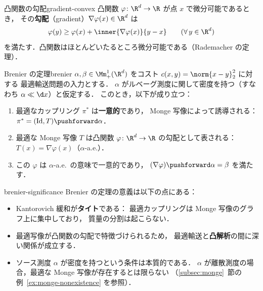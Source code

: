 \begin{definition}{凸関数の勾配}{gradient-convex}
  凸関数 $\varphi \colon \R^d \to \R$ が点 $x$ で微分可能であるとき，
  その\textbf{勾配}（gradient）$\nabla\varphi(x) \in \R^d$ は
  \[
    \varphi(y) \geq \varphi(x) + \inner{\nabla\varphi(x)}{y - x}
    \qquad (\forall\, y \in \R^d)
  \]
  を満たす．凸関数はほとんどいたるところ微分可能である（Rademacher の定理）．
\end{definition}

\begin{theorem}{Brenier の定理}{brenier}
  $\alpha, \beta \in \Mm_+^1(\R^d)$ をコスト $c(x, y) = \norm{x - y}_2^2$ に対する
  最適輸送問題の入力とする．
  $\alpha$ がルベーグ測度に関して密度を持つ（すなわち $\alpha \ll \d x$）と仮定する．
  このとき，以下が成り立つ：
  \begin{enumerate}
    \item 最適なカップリング $\pi^*$ は\textbf{一意的}であり，
      Monge 写像によって誘導される：$\pi^* = (\operatorname{Id}, T)\pushforward \alpha$．
    \item 最適な Monge 写像 $T$ は凸関数 $\varphi \colon \R^d \to \R$ の勾配として表される：
      $T(x) = \nabla\varphi(x)$（$\alpha$-a.e.）．
    \item この $\varphi$ は $\alpha$-a.e.\ の意味で一意的であり，
      $(\nabla\varphi)\pushforward \alpha = \beta$ を満たす．
  \end{enumerate}
\end{theorem}

\begin{remark}{}{brenier-significance}
  Brenier の定理の意義は以下の点にある：
  \begin{itemize}
    \item Kantorovich 緩和が\textbf{タイト}である：
      最適カップリングは Monge 写像のグラフ上に集中しており，
      質量の分割は起こらない．
    \item 最適写像が凸関数の勾配で特徴づけられるため，
      最適輸送と\textbf{凸解析}の間に深い関係が成立する．
    \item ソース測度 $\alpha$ が密度を持つという条件は本質的である．
      $\alpha$ が離散測度の場合，最適な Monge 写像が存在するとは限らない
      （\ref{subsec:monge}~節の例~\ref{ex:monge-nonexistence} を参照）．
  \end{itemize}
\end{remark}

